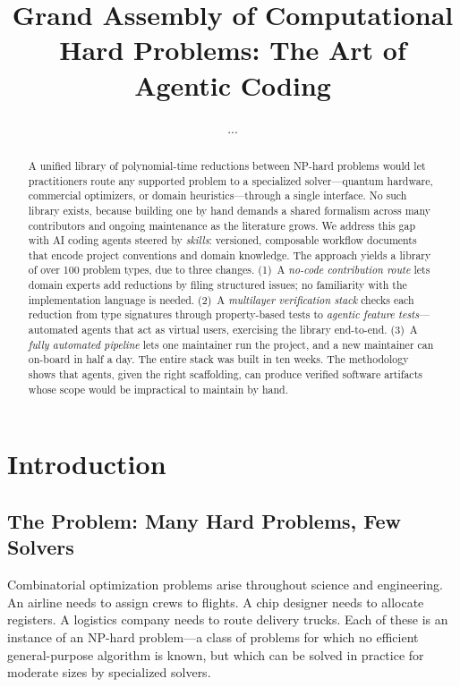 \documentclass[conference]{IEEEtran}
\begin{document}
\title{Grand Assembly of Computational Hard Problems: The Art of Agentic Coding}

\author{...}  %

\maketitle

\begin{abstract}
A unified library of polynomial-time reductions between NP-hard problems would let practitioners route any supported problem to a specialized solver---quantum hardware, commercial optimizers, or domain heuristics---through a single interface.
No such library exists, because building one by hand demands a shared formalism across many contributors and ongoing maintenance as the literature grows.
We address this gap with AI coding agents steered by \emph{skills}: versioned, composable workflow documents that encode project conventions and domain knowledge.
The approach yields a library of over 100 problem types, due to three changes.
(1)~A \emph{no-code contribution route} lets domain experts add reductions by filing structured issues; no familiarity with the implementation language is needed.
(2)~A \emph{multilayer verification stack} checks each reduction from type signatures through property-based tests to \emph{agentic feature tests}---automated agents that act as virtual users, exercising the library end-to-end.
(3)~A \emph{fully automated pipeline} lets one maintainer run the project, and a new maintainer can on-board in half a day.
The entire stack was built in ten weeks. The methodology shows that agents, given the right scaffolding, can produce verified software artifacts whose scope would be impractical to maintain by hand.
\end{abstract}

\section{Introduction}\label{sec:intro}

\subsection{The Problem: Many Hard Problems, Few Solvers}

Combinatorial optimization problems arise throughout science and engineering.
An airline needs to assign crews to flights.
A chip designer needs to allocate registers.
A logistics company needs to route delivery trucks.
Each of these is an instance of an NP-hard problem---a class of problems for which no efficient general-purpose algorithm is known, but which can be solved in practice for moderate sizes by specialized solvers.
\end{document}
